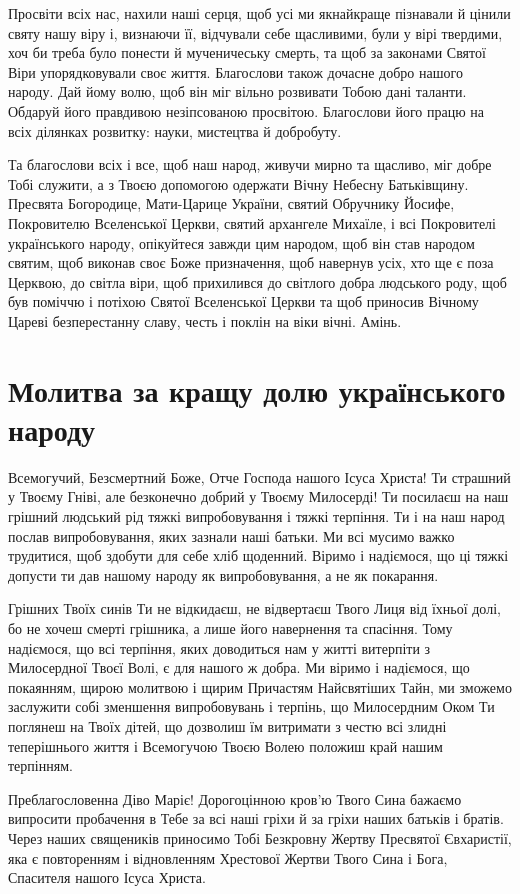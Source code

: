 \documentclass[chapters.tex]{subfiles}
\begin{document}
Просвіти всіх нас, нахили наші серця, щоб усі ми якнайкраще пізнавали й цінили святу нашу віру і, визнаючи її, відчували себе щасливими, були у вірі твердими, хоч би треба було понести й мученичеську смерть, та щоб за законами Святої Віри упорядковували своє життя. Благослови також дочасне добро нашого народу. Дай йому волю, щоб він міг вільно розвивати Тобою дані таланти. Обдаруй його правдивою незіпсованою просвітою. Благослови його працю на всіх ділянках розвитку: науки, мистецтва й добробуту.

Та благослови всіх і все, щоб наш народ, живучи мирно та щасливо, міг добре Тобі служити, а з Твоєю допомогою одержати Вічну Небесну Батьківщину. Пресвята Богородице, Мати-Царице України, святий Обручнику Йосифе, Покровителю Вселенської Церкви, святий архангеле Михаїле, і всі Покровителі українського народу, опікуйтеся завжди цим народом, щоб він став народом святим, щоб виконав своє Боже призначення, щоб навернув усіх, хто ще є поза Церквою, до світла віри, щоб прихилився до світлого добра людського роду, щоб був поміччю і потіхою Святої Вселенської Церкви та щоб приносив Вічному Цареві безперестанну славу, честь і поклін на віки вічні. Амінь.

\section{Молитва за кращу долю українського народу}
Всемогучий, Безсмертний Боже, Отче Господа нашого Ісуса Христа! Ти страшний у Твоєму Гніві, але безконечно добрий у Твоєму Милосерді! Ти посилаєш на наш грішний людський рід тяжкі випробовування і тяжкі терпіння. Ти і на наш народ послав випробовування, яких зазнали наші батьки. Ми всі мусимо важко трудитися, щоб здобути для себе хліб щоденний. Віримо і надіємося, що ці тяжкі допусти ти дав нашому народу як випробовування, а не як покарання.

Грішних Твоїх синів Ти не відкидаєш, не відвертаєш Твого Лиця від їхньої долі, бо не хочеш смерті грішника, а лише його навернення та спасіння. Тому надіємося, що всі терпіння, яких доводиться нам у житті витерпіти з Милосердної Твоєї Волі, є для нашого ж добра. Ми віримо і надіємося, що покаянням, щирою молитвою і щирим Причастям Найсвятіших Тайн, ми зможемо заслужити собі зменшення випробовувань і терпінь, що Милосердним Оком Ти поглянеш на Твоїх дітей, що дозволиш їм витримати з честю всі злидні теперішнього життя і Всемогучою Твоєю Волею положиш край нашим терпінням.

Преблагословенна Діво Маріє! Дорогоцінною кров’ю Твого Сина бажаємо випросити пробачення в Тебе за всі наші гріхи й за гріхи наших батьків і братів. Через наших священиків приносимо Тобі Безкровну Жертву Пресвятої Євхаристії, яка є повторенням і відновленням Хрестової Жертви Твого Сина і Бога, Спасителя нашого Ісуса Христа.
\end{document}

